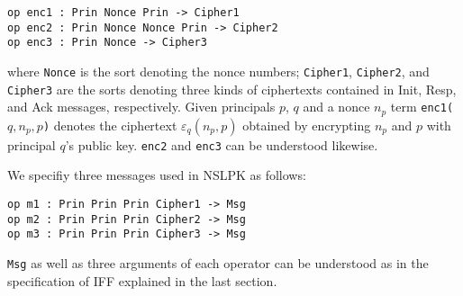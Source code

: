 \documentclass[10pt, conference, compsocconf]{IEEEtran}
\begin{document}
\begin{small}
\begin{verbatim}
op enc1 : Prin Nonce Prin -> Cipher1
op enc2 : Prin Nonce Nonce Prin -> Cipher2
op enc3 : Prin Nonce -> Cipher3
\end{verbatim}
\end{small}
%
%
%

\noindent
where 
\verb!Nonce! is the sort denoting the nonce numbers; 
\verb!Cipher1!, \verb!Cipher2!, and \verb!Cipher3! are the sorts denoting three kinds of ciphertexts contained in Init, Resp, and Ack messages, respectively.
Given principals $p$, $q$ and a nonce $n_p$ term \verb!enc1(!$q,n_p,p$\verb!)!
denotes the ciphertext $\varepsilon_q(n_p, p)$ obtained by encrypting $n_p$ and $p$ with principal $q$'s public key.
\verb!enc2! and \verb!enc3! can be understood likewise.


We specifiy three messages used in NSLPK as follows:
\begin{small}
	\begin{verbatim}
op m1 : Prin Prin Prin Cipher1 -> Msg
op m2 : Prin Prin Prin Cipher2 -> Msg
op m3 : Prin Prin Prin Cipher3 -> Msg
	\end{verbatim}
\end{small}

\noindent
\verb!Msg! as well as three arguments of each operator can be understood as in the specification of IFF explained in the last section.
%
\end{document}
